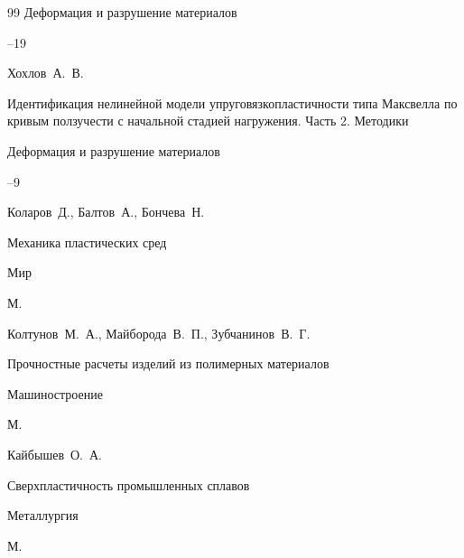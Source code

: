 \begin{thebibliography}{99}
\jour Деформация и разрушение материалов



--19







\by Хохлов~А.~В.

\paper Идентификация нелинейной модели упруговязкопластичности типа Максвелла по кривым ползучести с начальной стадией нагружения. Часть 2. Методики 

\jour Деформация и разрушение материалов



--9







\by Коларов~Д., Балтов~А., Бончева~Н.

\book Механика пластических сред


\publ Мир

\publaddr М.







\by Колтунов~М.~А., Майборода~В.~П., Зубчанинов~В.~Г.

\book Прочностные расчеты изделий из полимерных материалов


\publ Машиностроение

\publaddr М.







\by Кайбышев~О.~А.

\book Сверхпластичность промышленных сплавов


\publ Металлургия

\publaddr М.







\end{thebibliography}
